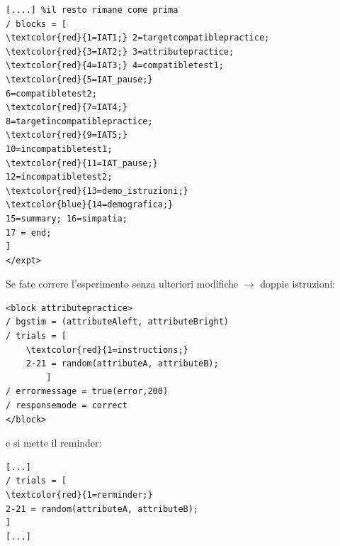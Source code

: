 \documentclass{beamer}
\begin{document}
\begin{frame}[fragile]
	\begin{footnotesize}
		\begin{Verbatim}[commandchars=\\\{\}]
[....] %il resto rimane come prima
/ blocks = [
\textcolor{red}{1=IAT1;} 2=targetcompatiblepractice; 
\textcolor{red}{3=IAT2;} 3=attributepractice; 
\textcolor{red}{4=IAT3;} 4=compatibletest1; 
\textcolor{red}{5=IAT_pause;}
6=compatibletest2; 
\textcolor{red}{7=IAT4;}
8=targetincompatiblepractice; 
\textcolor{red}{9=IAT5;}
10=incompatibletest1; 
\textcolor{red}{11=IAT_pause;}
12=incompatibletest2; 
\textcolor{red}{13=demo_istruzioni;}
\textcolor{blue}{14=demografica;}
15=summary; 16=simpatia;
17 = end;
]
</expt>
		\end{Verbatim}
	\end{footnotesize}

\end{frame}

\begin{frame}[fragile]
	Se fate correre l'esperimento senza ulteriori modifiche $\rightarrow$ doppie istruzioni:

			\begin{footnotesize}
			\begin{Verbatim}[commandchars=\\\{\}]
<block attributepractice>
/ bgstim = (attributeAleft, attributeBright)
/ trials = [
	\textcolor{red}{1=instructions;}
	2-21 = random(attributeA, attributeB);
		]
/ errormessage = true(error,200)
/ responsemode = correct
</block>			
			\end{Verbatim}
			\end{footnotesize}
e si mette il reminder: 
			\begin{footnotesize}
			\begin{Verbatim}[commandchars=\\\{\}]
[...]
/ trials = [
\textcolor{red}{1=rerminder;}
2-21 = random(attributeA, attributeB);
]
[...]
			\end{Verbatim}
		\end{footnotesize}

\end{frame}
\end{document}

